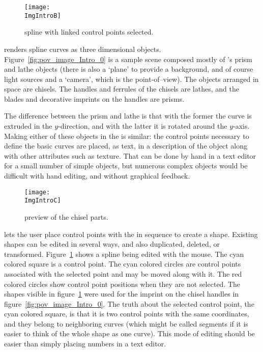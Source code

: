 \begin{figure}[htb]
\centering
\texttt{[image: \\ImgIntroB]}
\caption{\dtybeznu{} spline with linked control points selected.}
\label{fig:bezier_linked_control_points}
\end{figure}

\IXpov{} renders spline curves as three dimensional objects.
Figure~\ref{fig:pov_image_Intro_0} is a sample scene
composed mostly of \IXpov's prism and lathe objects
(there is also a `plane' to provide a background, and of course
light sources and a `camera', which is the point-of--view).
The objects arranged in space
are chisels. The handles and ferrules of the chisels are
\IXpov{} lathes, and the blades and decorative imprints
on the handles are prisms.

The difference between the prism and lathe is that
with the former the curve is extruded in the $y$-direction,
and with the latter it is rotated around the $y$-axis.
Making either of these objects in the \IXpov{} 
is similar: the control points necessary to define the
basic curves are placed, as text, in a description of
the object along with other attributes such as texture.
That can be done by hand in a text editor for a small
number of simple objects, but numerous complex objects
would be difficult with hand editing, and
without graphical feedback.

\begin{figure}[htb]
\centering
\texttt{[image: \\ImgIntroC]}
\caption{\dtypov{} preview of the chisel parts.}
\label{fig:chisel_edit_preview_1}
\end{figure}

\IXpkgu{} lets the user place control points with the
 in sequence to create a shape.
Existing shapes can be edited in several ways, and also
duplicated, deleted, or transformed.
Figure~\ref{fig:bezier_linked_control_points}
shows a \IXarg{\dtybezil} spline being edited with the mouse.
The cyan colored square is a  control
point. The cyan colored circles are control points
associated with the selected point and may be moved along with
it. The red colored circles show control point
positions when they are not selected. The shapes visible
in figure~\ref{fig:bezier_linked_control_points} were
used for the imprint on the chisel handles in
figure~\ref{fig:pov_image_Intro_0}. The truth about
the selected control point, the cyan colored square, is
that it is two control points with the same coordinates,
and they belong to neighboring curves (which might be
called segments if it is easier to think of the whole
shape as one curve). This mode of editing should be easier
than simply placing numbers in a text editor.

